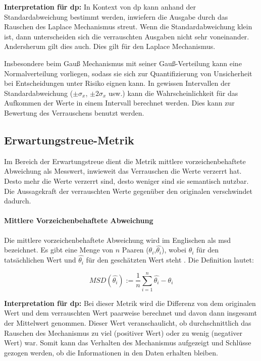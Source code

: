 \textbf{Interpretation für \gls{dp}: }
In Kontext von \gls{dp} kann anhand der Standardabweichung bestimmt werden, inwiefern die Ausgabe durch das Rauschen des Laplace Mechanismus streut. Wenn die Standardabweichung klein ist, dann unterscheiden sich die verrauschten Ausgaben nicht sehr voneinander. Andersherum gilt dies auch. Dies gilt für den Laplace Mechanismus.

Insbesondere beim Gauß Mechanismus mit seiner Gauß-Verteilung kann eine Normalverteilung vorliegen, sodass sie sich zur Quantifizierung von Unsicherheit bei Entscheidungen unter Risiko eignen kann. In gewissen Intervallen der Standardabweichung ($\pm\sigma_{x}$, $\pm2\sigma_{x}$ usw.) kann die Wahrscheinlichkeit für das Aufkommen der Werte in einem Intervall berechnet werden. Dies kann zur Bewertung des Verrauschens benutzt werden.

\subsection{Erwartungstreue-Metrik}
Im Bereich der Erwartungstreue dient die Metrik mittlere vorzeichenbehaftete Abweichung als Messwert, inwieweit das Verrauschen die Werte verzerrt hat. Desto mehr die Werte verzerrt sind, desto weniger sind sie semantisch nutzbar. Die Aussagekraft der verrauschten Werte gegenüber den originalen verschwindet dadurch.
\paragraph{Mittlere Vorzeichenbehaftete Abweichung}
Die mittlere vorzeichenbehaftete Abweichung wird im Englischen als \gls{msd} bezeichnet.
Es gibt eine Menge von $n$ Paaren ($\theta_{i}$,$\hat{\theta_{i}}$), wobei $\theta_{i}$ für den tatsächlichen Wert und $\hat{\theta_{i}}$ für den geschätzten Wert steht \parencite{MSD}. Die Definition lautet:

\begin{equation*}
	MSD(\hat{\theta_{i}}) := \frac{1}{n} \sum_{i=1}^{n}  \hat{\theta_{i}} - \theta_{i}
\end{equation*}

\textbf{Interpretation für \gls{dp}: }
Bei dieser Metrik wird die Differenz von dem originalen Wert und dem verrauschten Wert paarweise berechnet und davon dann insgesamt der Mittelwert genommen. Dieser Wert veranschaulicht, ob durchschnittlich das Rauschen des Mechanismus zu viel (positiver Wert) oder zu wenig (negativer Wert) war. Somit kann das Verhalten des Mechanismus aufgezeigt und Schlüsse gezogen werden, ob die Informationen in den Daten erhalten bleiben.
\newpage
